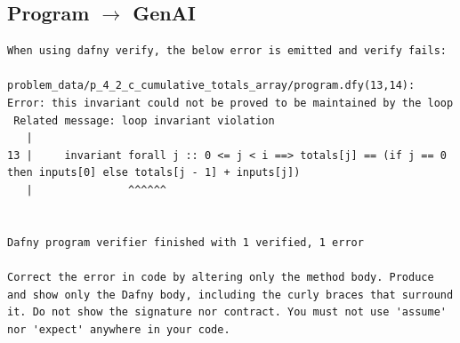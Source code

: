 \documentclass{article}
\begin{document}
\subsection*{Program $\rightarrow$ GenAI}
\begin{lstlisting}
When using dafny verify, the below error is emitted and verify fails:

problem_data/p_4_2_c_cumulative_totals_array/program.dfy(13,14): Error: this invariant could not be proved to be maintained by the loop
 Related message: loop invariant violation
   |
13 |     invariant forall j :: 0 <= j < i ==> totals[j] == (if j == 0 then inputs[0] else totals[j - 1] + inputs[j])
   |               ^^^^^^


Dafny program verifier finished with 1 verified, 1 error

Correct the error in code by altering only the method body. Produce and show only the Dafny body, including the curly braces that surround it. Do not show the signature nor contract. You must not use 'assume' nor 'expect' anywhere in your code.
\end{lstlisting}
\end{document}
